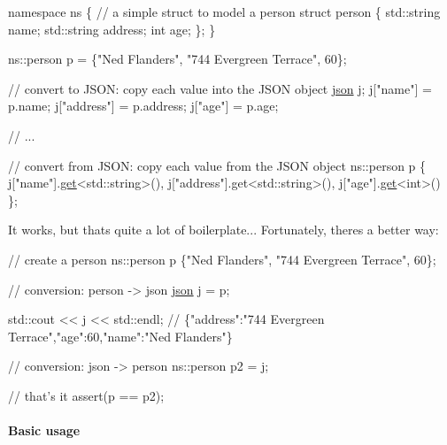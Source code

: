 \begin{DoxyCode}
\textcolor{keyword}{namespace }ns \{
    \textcolor{comment}{// a simple struct to model a person}
    \textcolor{keyword}{struct }person \{
        std::string name;
        std::string address;
        \textcolor{keywordtype}{int} age;
    \};
\}

ns::person p = \{\textcolor{stringliteral}{"Ned Flanders"}, \textcolor{stringliteral}{"744 Evergreen Terrace"}, 60\};

\textcolor{comment}{// convert to JSON: copy each value into the JSON object}
\hyperlink{classnlohmann_1_1basic__json}{json} j;
j[\textcolor{stringliteral}{"name"}] = p.name;
j[\textcolor{stringliteral}{"address"}] = p.address;
j[\textcolor{stringliteral}{"age"}] = p.age;

\textcolor{comment}{// ...}

\textcolor{comment}{// convert from JSON: copy each value from the JSON object}
ns::person p \{
    j[\textcolor{stringliteral}{"name"}].\hyperlink{classnlohmann_1_1basic__json_a6b187a22994c12c8cae0dd5ee99dc85e}{get}<std::string>(),
    j[\textcolor{stringliteral}{"address"}].get<std::string>(),
    j[\textcolor{stringliteral}{"age"}].\hyperlink{classnlohmann_1_1basic__json_a6b187a22994c12c8cae0dd5ee99dc85e}{get}<\textcolor{keywordtype}{int}>()
\};
\end{DoxyCode}


It works, but that\textquotesingle{}s quite a lot of boilerplate... Fortunately, there\textquotesingle{}s a better way\+:


\begin{DoxyCode}
\textcolor{comment}{// create a person}
ns::person p \{\textcolor{stringliteral}{"Ned Flanders"}, \textcolor{stringliteral}{"744 Evergreen Terrace"}, 60\};

\textcolor{comment}{// conversion: person -> json}
\hyperlink{classnlohmann_1_1basic__json}{json} j = p;

std::cout << j << std::endl;
\textcolor{comment}{// \{"address":"744 Evergreen Terrace","age":60,"name":"Ned Flanders"\}}

\textcolor{comment}{// conversion: json -> person}
ns::person p2 = j;

\textcolor{comment}{// that's it}
assert(p == p2);
\end{DoxyCode}


\paragraph*{Basic usage}

